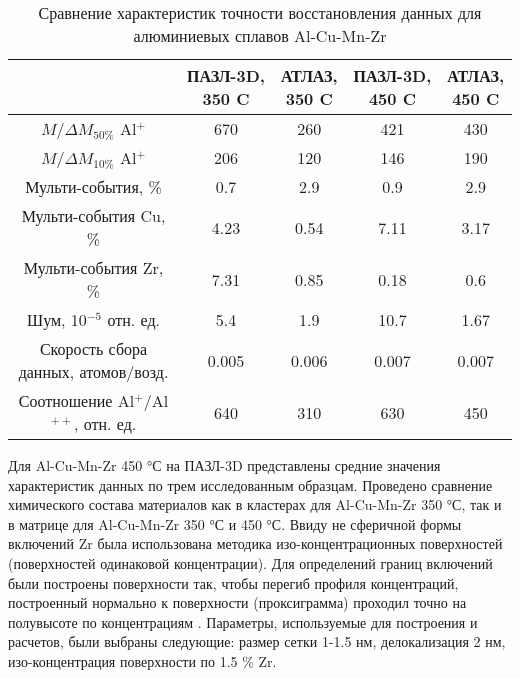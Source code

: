\begin{table} [htbp]
	\centering
	\caption{Сравнение характеристик точности восстановления данных для алюминиевых сплавов Al-Cu-Mn-Zr}
	\label{tab:paramsAPPLEvsATLAS}
	\begin{SingleSpace}
		\begin{tabular} {| c | c | c | c | c |}
			\hline
			    {} & \thead{ПАЗЛ-3D, \\350 \textdegree C} & \thead{АТЛАЗ, \\350 \textdegree C} & \thead{ПАЗЛ-3D, \\450 \textdegree C} & \thead{АТЛАЗ, \\450 \textdegree C} \\ \hline
			$M/\Delta M_{50\%}$ Al$^+$ & 670  & 260  & 421  & 430               \\ \hline
			$M/\Delta M_{10\%}$ Al$^+$ & 206  & 120  & 146  & 190               \\ \hline
			Мульти-события, \%         & 0.7  & 2.9  & 0.9  & 2.9               \\ \hline
			Мульти-события Cu, \%      & 4.23 & 0.54 & 7.11 & 3.17              \\ \hline
			Мульти-события Zr, \%      & 7.31 & 0.85 & 0.18 & 0.6               \\ \hline
			Шум, 10$^{-5}$ отн. ед. & 5.4   & 1.9   & 10.7  & 1.67  \\ \hline
			Скорость сбора данных, атомов/возд.        & 0.005 & 0.006 & 0.007 & 0.007 \\ \hline
			Соотношение Al$^+$/Al$^{++}$, отн. ед.    & 640   & 310   & 630   & 450   \\ \hline
		\end{tabular}
	\end{SingleSpace}
\end{table}

Для Al-Cu-Mn-Zr 450 °С на ПАЗЛ-3D представлены средние значения характеристик данных по трем исследованным образцам. Проведено сравнение химического состава материалов как в кластерах для Al-Cu-Mn-Zr 350 °С, так и в матрице для Al-Cu-Mn-Zr 350 °С и 450 °С. Ввиду не сферичной формы включений Zr была использована методика изо-концентрационных поверхностей (поверхностей одинаковой концентрации). Для определений границ включений были построены поверхности так, чтобы перегиб профиля концентраций, построенный нормально к поверхности (проксиграмма) проходил точно на полувысоте по концентрациям \cite{Hellman07}. Параметры, используемые для построения и расчетов, были выбраны следующие: размер сетки 1-1.5 нм, делокализация 2 нм, изо-концентрация поверхности по 1.5 \% Zr. 

